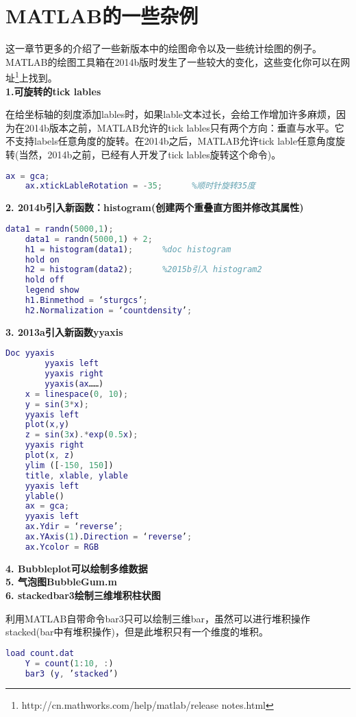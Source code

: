 \section{MATLAB的一些杂例 }
    \par
    这一章节更多的介绍了一些新版本中的绘图命令以及一些统计绘图的例子。
    MATLAB的绘图工具箱在2014b版时发生了一些较大的变化，这些变化你可以在网址\footnote{http://cn.mathworks.com/help/matlab/release notes.html}上找到。\\
    \textbf{1.可旋转的tick lables}
    \par
    在给坐标轴的刻度添加lables时，如果lable文本过长，会给工作增加许多麻烦，因为在2014b版本之前，MATLAB允许的tick lables只有两个方向：垂直与水平。它不支持labels任意角度的旋转。在2014b之后，MATLAB允许tick lable任意角度旋转(当然，2014b之前，已经有人开发了tick lables旋转这个命令)。
    \begin{lstlisting}[language=Matlab]
    ax = gca;
    ax.xtickLableRotation = -35;      %顺时针旋转35度
    \end{lstlisting}
    \textbf{2. 2014b引入新函数：histogram(创建两个重叠直方图并修改其属性)}
    \begin{lstlisting}[language=Matlab]
    data1 = randn(5000,1);
    data1 = randn(5000,1) + 2;
    h1 = histogram(data1);      %doc histogram
    hold on
    h2 = histogram(data2);      %2015b引入 histogram2
    hold off
    legend show
    h1.Binmethod = ‘sturgcs’;
    h2.Normalization = ‘countdensity’;
    \end{lstlisting}
    \textbf{3. 2013a引入新函数yyaxis}
    \begin{lstlisting}[language=Matlab]
    Doc yyaxis
        yyaxis left
        yyaxis right
        yyaxis(ax……)
    x = linespace(0, 10);
    y = sin(3*x);
    yyaxis left
    plot(x,y)
    z = sin(3x).*exp(0.5x);
    yyaxis right
    plot(x, z)
    ylim ([-150, 150])
    title, xlable, ylable
    yyaxis left
    ylable()
    ax = gca;
    yyaxis left
    ax.Ydir = ‘reverse’;
    ax.YAxis(1).Direction = ‘reverse’;
    ax.Ycolor = RGB
    \end{lstlisting}
    \textbf{4. Bubbleplot可以绘制多维数据}\\
    \textbf{5. 气泡图BubbleGum.m}\\
    \textbf{6. stackedbar3绘制三维堆积柱状图}
    \par
    利用MATLAB自带命令bar3只可以绘制三维bar，虽然可以进行堆积操作stacked(bar中有堆积操作)，但是此堆积只有一个维度的堆积。
    \begin{lstlisting}[language=Matlab]
    load count.dat
    Y = count(1:10, :)
    bar3 (y, ’stacked’)
    \end{lstlisting}
